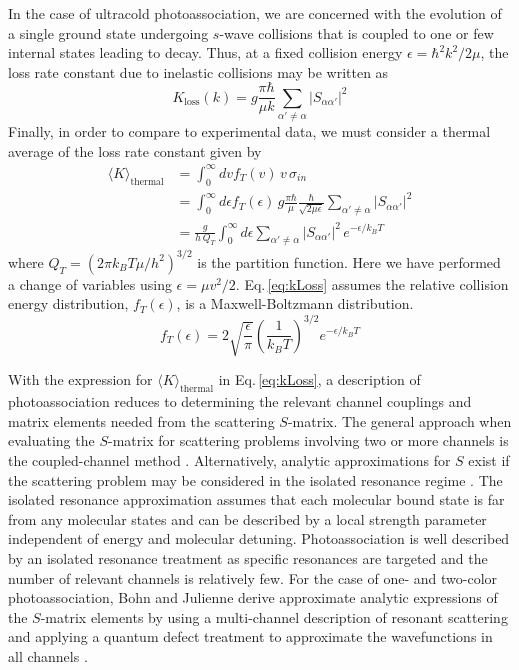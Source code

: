 In the case of ultracold photoassociation, we are concerned with the evolution of a single ground state undergoing $s$-wave collisions that is coupled to one or few internal states leading to decay.
Thus, at a fixed collision energy $\epsilon = \hbar^2 k^2 / 2\mu$, the loss rate constant due to inelastic collisions may be written as 
\begin{equation}
	K_{\text{loss}}(k) = g \frac{\pi \hbar}{\mu k} \sum_{\alpha' \neq \alpha}\vert S_{\alpha \alpha'} \vert^2
\end{equation}
Finally, in order to compare to experimental data, we must consider a thermal average of the loss rate constant given by \hl{\cite{Julienne2009, Julienne2009a, Julienne2009a}}
\begin{align} \label{eq:kLoss}
  \langle K \rangle_\text{thermal} &= \int_0^{\infty} dv f_T(v)\,v\,\sigma_{in} \\
                                  &= \int_0^{\infty} d\epsilon  f_T(\epsilon)\, g \frac{\pi \hbar}{\mu} \frac{\hbar}{\sqrt{2 \mu \epsilon}} \sum_{\alpha' \neq \alpha}\vert S_{\alpha \alpha'} \vert^2 \\
                                  &= \frac{g}{h\,Q_{T}} \int_{0}^{\infty} d\epsilon \sum_{\alpha' \neq \alpha}\vert S_{\alpha \alpha'} \vert^2 \,e^{-\epsilon/k_{B}T}
\end{align}
where $Q_T=(2 \pi k_B T \mu/h^2)^{3/2}$ is the partition function.
Here we have performed a change of variables using $\epsilon = \mu v^2/2$.
Eq.\,\ref{eq:kLoss} assumes the relative collision energy distribution, $f_T(\epsilon)$, is a Maxwell-Boltzmann distribution.
\begin{equation}
	f_T(\epsilon) = 2 \sqrt{\frac{\epsilon}{\pi}} \left( \frac{1}{k_B T} \right)^{3/2} e^{-\epsilon/k_B T}
\end{equation}

With the expression for $ \langle K \rangle_\text{thermal}$ in Eq.\,\ref{eq:kLoss}, a description of photoassociation reduces to determining the relevant channel couplings and matrix elements needed from the scattering $S$-matrix.
The general approach when evaluating the $S$-matrix for scattering problems involving two or more channels is the coupled-channel method \cite{Krems2009a}.
Alternatively, analytic approximations for $S$ exist if the scattering problem may be considered in the isolated resonance regime \cite{Bohn1999, Nicholson2015a}.
The isolated resonance approximation assumes that each molecular bound state is far from any molecular states and can be described by a local strength parameter independent of energy and molecular detuning.
Photoassociation is well described by an isolated resonance treatment as specific resonances are targeted and the number of relevant channels is relatively few.
For the case of one- and two-color photoassociation, Bohn and Julienne derive approximate analytic expressions of the $S$-matrix elements by using a multi-channel description of resonant scattering and applying a quantum defect treatment to approximate the wavefunctions in all channels \cite{Bohn1999, Bohn1996, Julienne2006}.

